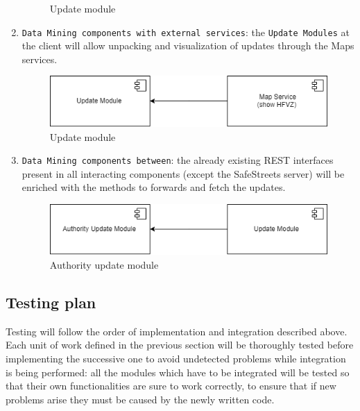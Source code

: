 \documentclass[12pt,a4paper]{article}
\begin{document}
\begin{enumerate}
\begin{figure}[H]
		\caption{Update module}
\end{figure}
\item \texttt{Data Mining components with external services}: the \texttt{Update Modules} at the client will allow unpacking and visualization of updates through the Maps services. 
\begin{figure}[H]
		\centering
			\includegraphics[width=1.0\linewidth]{Images/Integration/StatisticIntegrationChart2}
		\caption{Update module}
\end{figure}
\item \texttt{Data Mining components between}: the already existing REST interfaces present in all interacting components (except the SafeStreets server) will be enriched with the methods to forwards and fetch the updates.
\begin{figure}[H]
		\centering
			\includegraphics[width=1.0\linewidth]{Images/Integration/StatisticIntegrationChart3}
		\caption{Authority update module}
\end{figure}
\end{enumerate}
\subsection{Testing plan}
Testing will follow the order of implementation and integration described above.
Each unit of work defined in the previous section will be thoroughly tested before implementing the successive one to avoid undetected problems while integration is being performed: all the modules which have to be integrated will be tested so that their own functionalities are sure to work correctly, to ensure that if new problems arise they must be caused by the newly written code.
\end{document}
